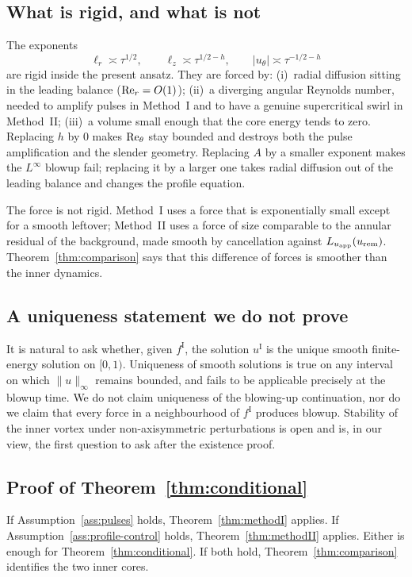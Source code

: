 \subsection{What is rigid, and what is not}

The exponents
\[
\ell_r\asymp\tau^{1/2},\qquad
\ell_z\asymp\tau^{1/2-h},\qquad
|u_\theta|\asymp\tau^{-1/2-h}
\]
are rigid inside the present ansatz. They are forced by: (i)~radial diffusion sitting in the leading balance ($\mathrm{Re}_r=O(1)$); (ii)~a diverging angular {R}eynolds number, needed to amplify pulses in Method~I and to have a genuine supercritical swirl in Method~II; (iii)~a volume small enough that the core energy tends to zero. Replacing $h$ by $0$ makes $\mathrm{Re}_\theta$ stay bounded and destroys both the pulse amplification and the slender geometry. Replacing $A$ by a smaller exponent makes the $L^\infty$ blowup fail; replacing it by a larger one takes radial diffusion out of the leading balance and changes the profile equation.

The force is not rigid. Method~I uses a force that is exponentially small except for a smooth leftover; Method~II uses a force of size comparable to the annular residual of the background, made smooth by cancellation against $L_{u_{\mathrm{app}}}(u_{\mathrm{rem}})$. Theorem~\ref{thm:comparison} says that this difference of forces is smoother than the inner dynamics.

\subsection{A uniqueness statement we do not prove}

It is natural to ask whether, given $f^{\mathrm I}$, the solution $u^{\mathrm I}$ is the unique smooth finite-energy solution on $[0,1)$. Uniqueness of smooth solutions is true on any interval on which $\|u\|_\infty$ remains bounded, and fails to be applicable precisely at the blowup time. We do not claim uniqueness of the blowing-up continuation, nor do we claim that every force in a neighbourhood of $f^{\mathrm I}$ produces blowup. Stability of the inner vortex under non-axisymmetric perturbations is open and is, in our view, the first question to ask after the existence proof.

\subsection{Proof of Theorem~\ref{thm:conditional}}

If Assumption~\ref{ass:pulses} holds, Theorem~\ref{thm:methodI} applies. If Assumption~\ref{ass:profile-control} holds, Theorem~\ref{thm:methodII} applies. Either is enough for Theorem~\ref{thm:conditional}. If both hold, Theorem~\ref{thm:comparison} identifies the two inner cores.
